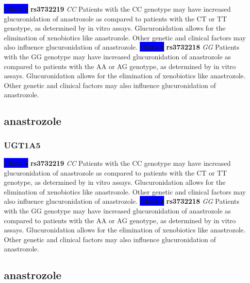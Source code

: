 \documentclass{book}
\begin{document}
\begin{center}

\textbf{\colorbox{blue} {Class 4}} \textbf{ rs3732219 } \textit{ CC }
Patients with the CC genotype may have increased glucuronidation of anastrozole as compared to patients with the CT or TT genotype, as determined by in vitro assays. Glucuronidation allows for the elimination of xenobiotics like anastrozole. Other genetic and clinical factors may also influence glucuronidation of anastrozole. \textbf{\colorbox{blue} {Class 4}} \textbf{ rs3732218 } \textit{ GG }
Patients with the GG genotype may have increased glucuronidation of anastrozole as compared to patients with the AA or AG genotype, as determined by in vitro assays. Glucuronidation allows for the elimination of xenobiotics like anastrozole. Other genetic and clinical factors may also influence glucuronidation of anastrozole.

\end{center}\subsection{ anastrozole }


\subsubsection{ UGT1A5 }

\begin{center}

\textbf{\colorbox{blue} {Class 4}} \textbf{ rs3732219 } \textit{ CC }
Patients with the CC genotype may have increased glucuronidation of anastrozole as compared to patients with the CT or TT genotype, as determined by in vitro assays. Glucuronidation allows for the elimination of xenobiotics like anastrozole. Other genetic and clinical factors may also influence glucuronidation of anastrozole. \textbf{\colorbox{blue} {Class 4}} \textbf{ rs3732218 } \textit{ GG }
Patients with the GG genotype may have increased glucuronidation of anastrozole as compared to patients with the AA or AG genotype, as determined by in vitro assays. Glucuronidation allows for the elimination of xenobiotics like anastrozole. Other genetic and clinical factors may also influence glucuronidation of anastrozole.

\end{center}\subsection{ anastrozole }
\end{document}
